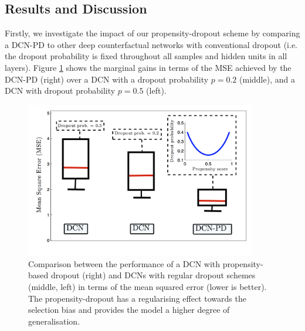 \subsection{Results and Discussion}
Firstly, we investigate the impact of our propensity-dropout scheme by comparing a DCN-PD to other deep counterfactual networks with conventional dropout (i.e. the dropout probability is fixed throughout all samples and hidden units in all layers). Figure \ref{fig:propensity-dropout-boxplot} shows the marginal gains in terms of the MSE achieved by the DCN-PD (right) over a DCN with a dropout probability $p=0.2$ (middle), and a DCN with dropout probability $p=0.5$ (left). 





\begin{figure}[h]
	\centering
	\includegraphics[width=0.9\textwidth]{figures/chapter-5/pd-boxplot.png}
	\caption{Comparison between the performance of a DCN with propensity-based dropout (right) and DCNs with regular dropout schemes (middle, left) in terms of the mean squared error (lower is better). The propensity-dropout has a regularising effect towards the selection bias and provides the model a higher degree of generalisation. }\label{fig:propensity-dropout-boxplot}
\end{figure}

